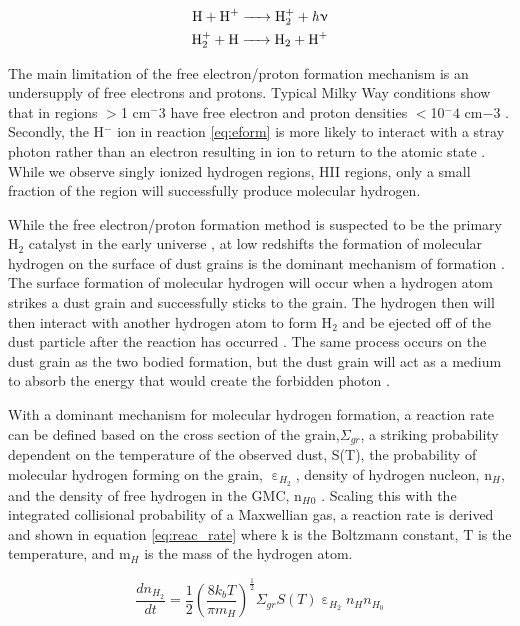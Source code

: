 \begin{equation}\label{eq:pform}
  \begin{split}
    \ce{H + H^+ -> H^+_2 + \it{h\nu}} \\
    \ce{H^+_2 + H -> H_2 + H^+}
  \end{split}
\end{equation}

The main limitation of the free electron/proton formation mechanism is an undersupply of free electrons and protons.  Typical Milky Way conditions show that in regions $>$1 cm$^-3$ have free electron and proton densities $<$10$^-4$ cm$-3$ \citep{wolfire2003}.  Secondly, the H$^-$ ion in reaction \ref{eq:eform} is more likely to interact with a stray photon rather than an electron resulting in ion to return to the atomic state \citep{glover2003}.  While we observe singly ionized hydrogen regions, HII regions, only a small fraction of the region will successfully produce molecular hydrogen.

While the free electron/proton formation method is suspected to be the primary H$_2$ catalyst in the early universe \citep{herbst2005}, at low redshifts the formation of molecular hydrogen on the surface of dust grains is the dominant mechanism of formation \citep{krumholz2014}.  The surface formation of molecular hydrogen will occur when a hydrogen atom strikes a dust grain and successfully sticks to the grain.  The hydrogen then will then interact with another hydrogen atom to form H$_2$ and be ejected off of the dust particle after the reaction has occurred \citep{pirronello1997}.  The same process occurs on the dust grain as the two bodied formation, but  the dust grain will act as a medium to absorb the energy that would create the forbidden photon \citep{krumholz2014}.

With a dominant mechanism for molecular hydrogen formation, a reaction rate can be defined based on the cross section of the grain,$\Sigma_{gr}$, a striking probability dependent on the temperature of the observed dust, S(T), the probability of molecular hydrogen forming on the grain, $\upepsilon_{H_2}$, density of hydrogen nucleon, n$_H$, and the density of free hydrogen in the GMC, n$_H{_0}$ \citep{krumholz2014}.  Scaling this with the integrated collisional probability of a Maxwellian gas, a reaction rate is derived and shown in equation \ref{eq:reac_rate} where k is the Boltzmann constant, T is the temperature, and m$_H$ is the mass of the hydrogen atom.

\begin{equation}\label{eq:reac_rate}
  \frac{dn_{H_2}}{dt} = \frac{1}{2}\left(\frac{8k_bT}{\pi m_H}\right)^\frac{1}{2}\Sigma_{gr}S\left(T\right)\upepsilon_{H_2}n_{H}n_{H_0}
\end{equation}


